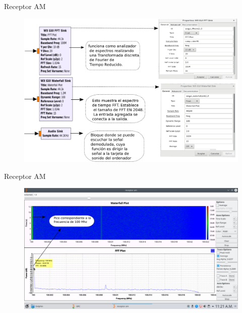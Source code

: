 \begin{frame}{Receptor AM}

\begin{figure}[H]
\centering
\vspace{-3mm}
\includegraphics[width=\textwidth]{parte3/lab16/pdf/lab16_7.pdf}

\end{figure}

\end{frame}

\begin{frame}{Receptor AM}

\begin{figure}[H]
\centering
\vspace{-3mm}
\includegraphics[width=\textwidth]{parte3/lab16/pdf/lab16_8.pdf}

\end{figure}

\end{frame}

